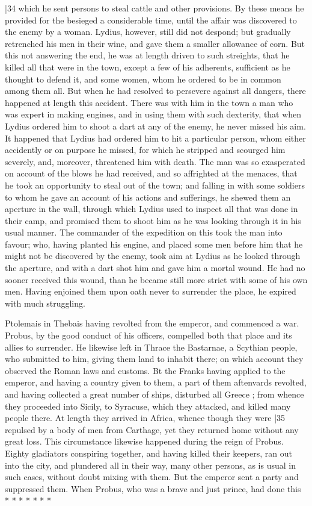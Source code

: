 |34 which he sent persons to steal cattle and other provisions. By these means he provided for the besieged a considerable time, until the affair was discovered to the enemy by a woman. Lydius, however, still did not despond; but gradually retrenched his men in their wine, and gave them a smaller allowance of corn. But this not answering the end, he was at length driven to such streights, that he killed all that were in the town, except a few of his adherents, sufficient as he thought to defend it, and some women, whom he ordered to be in common among them all. But when he had resolved to persevere against all dangers, there happened at length this accident. There was with him in the town a man who was expert in making engines, and in using them with such dexterity, that when Lydius ordered him to shoot a dart at any of the enemy, he never missed his aim. It happened that Lydius had ordered him to hit a particular person, whom either accidently or on purpose he missed, for which he stripped and scourged him severely, and, moreover, threatened him with death. The man was so exasperated on account of the blows he had received, and so affrighted at the menaces, that he took an opportunity to steal out of the town; and falling in with some soldiers to whom he gave an account of his actions and sufferings, he shewed them an aperture in the wall, through which Lydius used to inspect all that was done in their camp, and promised them to shoot him as he was looking through it in his usual manner. The commander of the expedition on this took the man into favour; who, having planted his engine, and placed some men before him that he might not be discovered by the enemy, took aim at Lydius as he looked through the aperture, and with a dart shot him and gave him a mortal wound. He had no sooner received this wound, than he became still more strict with some of his own men. Having enjoined them upon oath never to surrender the place, he expired with much struggling.

Ptolemais in Thebais having revolted from the emperor, and commenced a war. Probus, by the good conduct of his officers, compelled both that place and its allies to surrender. He likewise left in Thrace the Bastarnae, a Scythian people, who submitted to him, giving them land to inhabit there; on which account they observed the Roman laws and customs. Bt the Franks having applied to the emperor, and having a country given to them, a part of them aftenvards revolted, and having collected a great number of ships, disturbed all Greece ; from whence they proceeded into Sicily, to Syracuse, which they attacked, and killed many people there. At length they arrived in Africa, whence though they were
|35 repulsed by a body of men from Carthage, yet they returned home without any great loss. This circumstance likewise happened during the reign of Probus. Eighty gladiators conspiring together, and having killed their keepers, ran out into the city, and plundered all in their way, many other persons, as is usual in such cases, without doubt mixing with them. But the emperor sent a party and suppressed them. When Probus, who was a brave and just prince, had done this
* * * * * * *

